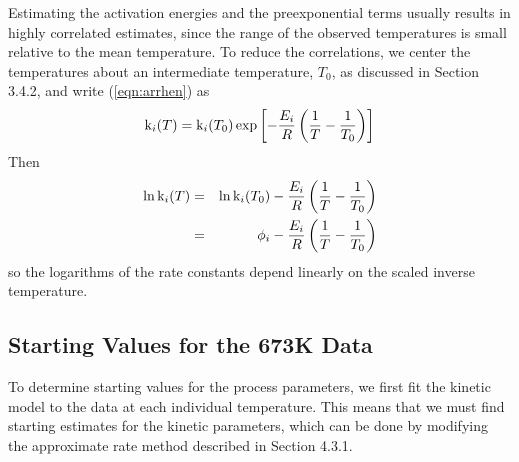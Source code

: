 Estimating the activation energies and the preexponential
terms usually results in highly correlated estimates, since
the range of the observed temperatures is small
relative to the mean temperature.
To reduce the correlations, we center the temperatures about
an intermediate temperature, $T_{0}$, as discussed in Section 3.4.2,
and write (\ref{eqn:arrhen})
as
\begin{displaymath}
  {\rm k}_i ( T ) = {\rm k}_i ( T_0 ) 
  \exp {\left[ - \frac{E_i}{R}\left(\frac{1}{T}-\frac{1}{T_0}\right)\right]}
\end{displaymath}
Then
\begin{eqnarray}\label{eqn:logarr}
  \ln{\rm k}_i ( T )&=&\ln{\rm k}_i ( T_0 )
  - \frac{E_i}{R}\left(\frac{1}{T}-\frac{1}{T_0}\right)\\
  &=&\phi_i
  -\frac{E_i}{R}\left(\frac{1}{T}-\frac{1}{T_0}\right)\nonumber
\end{eqnarray}
so the logarithms of the rate constants depend linearly
on the scaled inverse temperature.

\subsection{Starting Values for the 673K Data}

To determine starting values for the process parameters, we first fit
the kinetic model to the data at each individual temperature.  This
means that we must find starting estimates for the kinetic parameters,
which can be done by modifying the approximate rate method described
in Section 4.3.1.

